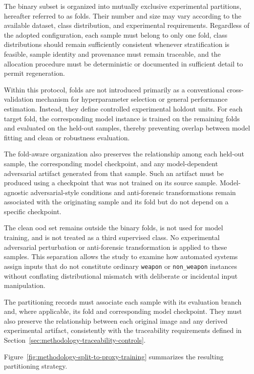 The binary subset is organized into mutually exclusive experimental
partitions, hereafter referred to as folds. Their number and size may vary
according to the available dataset, class distribution, and experimental
requirements. Regardless of the adopted configuration, each sample must belong
to only one fold, class distributions should remain sufficiently consistent
whenever stratification is feasible, sample identity and provenance must remain
traceable, and the allocation procedure must be deterministic or documented in
sufficient detail to permit regeneration.

Within this protocol, folds are not introduced primarily as a conventional
cross-validation mechanism for hyperparameter selection or general performance
estimation. Instead, they define controlled experimental holdout units. For
each target fold, the corresponding model instance is trained on the
remaining folds and evaluated on the held-out samples, thereby preventing
overlap between model fitting and clean or robustness evaluation.

The fold-aware organization also preserves the relationship among each
held-out sample, the corresponding model checkpoint, and any
model-dependent adversarial artifact generated from that sample. Such an
artifact must be produced using a checkpoint that was not trained on its source
sample. Model-agnostic adversarial-style conditions and anti-forensic
transformations remain associated with the originating sample and its fold but
do not depend on a specific checkpoint.

The clean \gls{ood} set remains outside the binary folds, is not used for
model training, and is not treated as a third supervised class. No
experimental adversarial perturbation or anti-forensic transformation is
applied to these samples. This separation allows the study to examine how
automated systems assign inputs that do not constitute ordinary
\texttt{weapon} or \texttt{non\_weapon} instances without conflating
distributional mismatch with deliberate or incidental input manipulation.

The partitioning records must associate each sample with its evaluation branch
and, where applicable, its fold and corresponding model checkpoint. They
must also preserve the relationship between each original image and any
derived experimental artifact, consistently with the traceability requirements
defined in Section~\ref{sec:methodology-traceability-controls}.

Figure~\ref{fig:methodology-split-to-proxy-training} summarizes the resulting
partitioning strategy.



